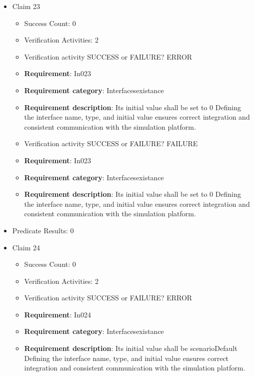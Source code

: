 \documentclass{article}
\begin{document}
\begin{itemize}
  				  \item Claim 23
				\begin{itemize}
			    	\item Success Count: 0 
			    	\item Verification Activities: 2
					\item Verification activity SUCCESS or FAILURE? ERROR
		
						\item \textbf{Requirement}: In023 
						\item \textbf{Requirement category}: Interfacesexistance 
						\item \textbf{Requirement description}: Its initial value shall be set to 0 Defining the interface name, type, and initial value ensures correct integration and consistent communication with the simulation platform.
					
					\item Verification activity SUCCESS or FAILURE? FAILURE
		
						\item \textbf{Requirement}: In023 
						\item \textbf{Requirement category}: Interfacesexistance 
						\item \textbf{Requirement description}: Its initial value shall be set to 0 Defining the interface name, type, and initial value ensures correct integration and consistent communication with the simulation platform.
					
				\end{itemize}
				
									    
				\item Predicate Results: 0

  				  \item Claim 24
				\begin{itemize}
			    	\item Success Count: 0 
			    	\item Verification Activities: 2
					\item Verification activity SUCCESS or FAILURE? ERROR
		
						\item \textbf{Requirement}: In024 
						\item \textbf{Requirement category}: Interfacesexistance 
						\item \textbf{Requirement description}: Its initial value shall be scenarioDefault Defining the interface name, type, and initial value ensures correct integration and consistent communication with the simulation platform.
					

\end{itemize}
\end{itemize}
\end{document}
